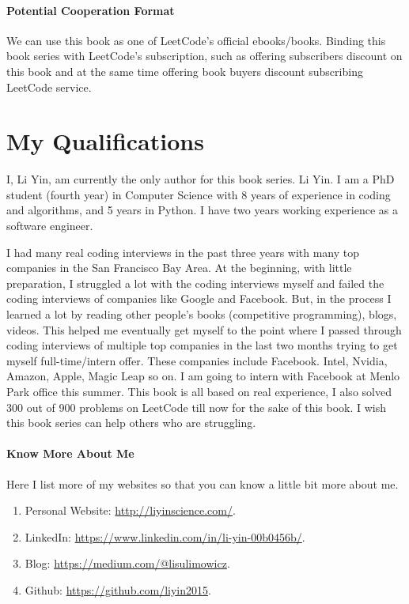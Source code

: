 \documentclass[12pt]{article}
\begin{document}
\paragraph{Potential Cooperation Format} We can use this book as one of LeetCode's official ebooks/books. Binding this book series with LeetCode's subscription, such as offering subscribers discount on this book and at the same time offering book buyers discount subscribing LeetCode service.




\section{My Qualifications}
I, Li Yin, am currently the only author for this book series. Li Yin. I am a PhD student (fourth year) in Computer Science with 8 years of experience in coding and algorithms, and 5 years in Python. I have two years working experience as a software engineer.  

I had many real coding interviews in the past three years with many top companies in the San Francisco Bay Area. At the beginning, with little preparation, I struggled a lot with the coding interviews myself and failed the coding interviews of companies like Google and Facebook. But, in the process I learned a lot by reading other people's books (competitive programming), blogs, videos. This helped me eventually get myself to the point where I passed through coding interviews of multiple top companies in the last two months trying to get myself full-time/intern offer. These companies include Facebook. Intel, Nvidia, Amazon, Apple, Magic Leap so on. I am going to intern with Facebook at Menlo Park office this summer. This book is all based on real experience, I also solved 300 out of 900 problems on LeetCode till now for the sake of this book. I wish this book series can help others who are struggling. 

\paragraph{Know More About Me} Here I list more of my websites so that you can know a little bit more about me.
\begin{enumerate}
    \item Personal Website: \url{http://liyinscience.com/}.
    \item LinkedIn: \url{https://www.linkedin.com/in/li-yin-00b0456b/}.
    \item Blog: \url{https://medium.com/@lisulimowicz}. 
    \item Github: \url{https://github.com/liyin2015}.
\end{enumerate}
    
\end{document}
